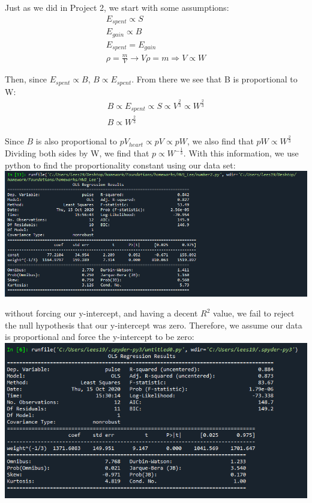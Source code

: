 \documentclass[12pt,letterpaper]{article}
\begin{document}
\begin{enumerate}
Just as we did in Project 2, we start with some assumptions:
\begin{gather*}
  E_{spent} \propto S\\
  E_{gain} \propto B\\
  E_{spent} = E_{gain} \\
  \rho = \frac{m}{V} \rightarrow V\rho = m \Rightarrow V \propto W
\end{gather*}

Then, since $E_{spent} \propto B$, $B \propto E_{spent}$. From there we see that 
B is proportional to W:  
\begin{gather*}
  B \propto E_{spent} \propto S \propto V^{\frac{2}{3}} \propto W^{\frac{2}{3}}\\
  B \propto W^{\frac{2}{3}}
\end{gather*}

Since $B$ is also proportional to $pV_{heart} \propto pV \propto pW$, we also find that $pW \propto W^{\frac{2}{3}}$
Dividing both sides by W, we find that $p \propto W^{-\frac{1}{3}}$. With this information, 
we use python to find the proportionality constant using our data set: \\

\includegraphics[scale = .7]{number2pval.png}

without forcing our y-intercept, and having a decent $R^2$ value, we fail to reject the 
null hypothesis that our y-intercept was zero. Therefore, we assume our data is proportional
and force the y-intercept to be zero: \\
\includegraphics{number2.png}


\end{enumerate}
\end{document}
